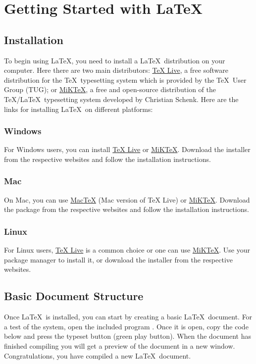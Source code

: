 \chapter{Getting Started with \LaTeX}\label{ch:gettingstarted}
	\section{Installation}
		To begin using \LaTeX, you need to install a \LaTeX\ distribution on your computer.
		Here there are two main distributors: \href{https://tug.org/texlive}{TeX Live}, a free software distribution for the \TeX\ typesetting system which is provided by the \TeX\ User Group (TUG); or \href{https://miktex.org/}{MiKTeX}, a free and open-source distribution of the \TeX/\LaTeX\ typesetting system developed by Christian Schenk.
		Here are the links for installing \LaTeX\ on different platforms:

		\subsection{Windows}
			For Windows users, you can install \href{https://tug.org/texlive/windows.html}{TeX Live} or \href{https://miktex.org/download}{MiKTeX}. 
			Download the installer from the respective websites and follow the installation instructions.

		\subsection{Mac}
			On Mac, you can use \href{https://tug.org/mactex/}{MacTeX} (Mac version of TeX Live) or \href{https://miktex.org/download}{MiKTeX}. 
			Download the package from the respective websites and follow the installation instructions.

		\subsection{Linux}
			For Linux users, \href{https://tug.org/texlive/quickinstall.html}{TeX Live} is a common choice or one can use \href{https://miktex.org/download}{MiKTeX}. 
			Use your package manager to install it, or download the installer from the respective websites.

	\section{Basic Document Structure}\label{sec:basicdocstucture}
		Once \LaTeX\ is installed, you can start by creating a basic \LaTeX\ document.
		For a test of the system, open the included program .
		Once it is open, copy the code below and press the typeset button (green play button).
		When the document has finished compiling you will get a preview of the document in a new window.
		Congratulations, you have compiled a new \LaTeX\ document.


